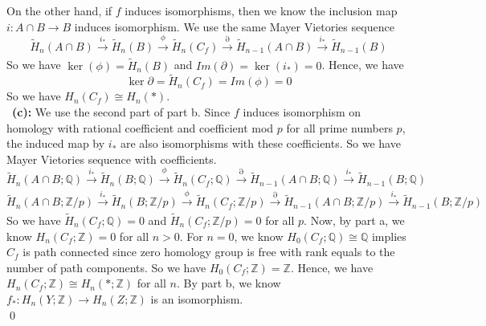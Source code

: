 \documentclass[12pt]{amsart}
\newcommand{\Q}{\mathbb{Q}}
\newcommand{\Z}{\mathbb{Z}}
\begin{document}
On the other hand, if $f$ induces isomorphisms, then we know the inclusion map $i:A\cap B\to B$ induces isomorphism. We use the same Mayer Vietories sequence 
\[\tilde{H}_n(A\cap B)\xrightarrow[]{i_\ast} \tilde{H}_n(B)\xrightarrow[]{\phi} \tilde{H}_n(C_f)\xrightarrow[]{\partial} \tilde{H}_{n-1}(A\cap B)\xrightarrow[]{i_\ast} \tilde{H}_{n-1}(B)\]
So we have $\ker(\phi)=\tilde{H}_n(B)$ and $Im(\partial)=\ker(i_\ast)=0$. Hence, we have 
\[\ker\partial=\tilde{H}_n(C_f)=Im(\phi)=0\]
So we have $H_n(C_f)\cong H_n(\ast)$.\\\
\textbf{(c):} We use the second part of part b. Since $f$ induces isomorphism on homology with rational coefficient and coefficient mod $p$ for all prime numbers $p$, the induced map by $i_\ast$ are also isomorphisms with these coefficients. So we have Mayer Vietories sequence with coefficients.
\[\tilde{H}_n(A\cap B;\Q)\xrightarrow[]{i_\ast} \tilde{H}_n(B;\Q)\xrightarrow[]{\phi} \tilde{H}_n(C_f;\Q)\xrightarrow[]{\partial} \tilde{H}_{n-1}(A\cap B;\Q)\xrightarrow[]{i_\ast} \tilde{H}_{n-1}(B;\Q)\]
\[\tilde{H}_n(A\cap B;\Z/p)\xrightarrow[]{i_\ast} \tilde{H}_n(B;\Z/p)\xrightarrow[]{\phi} \tilde{H}_n(C_f;\Z/p)\xrightarrow[]{\partial} \tilde{H}_{n-1}(A\cap B;\Z/p)\xrightarrow[]{i_\ast} \tilde{H}_{n-1}(B;\Z/p)\]
So we have $\tilde{H}_n(C_f;\Q)=0$ and $\tilde{H}_n(C_f;\Z/p)=0$ for all $p$. Now, by part a, we know $H_n(C_f;\Z)=0$ for all $n>0$. For $n=0$, we know $H_0(C_f;\Q)\cong \Q$ implies $C_f$ is path connected since zero homology group is free with rank equals to the number of path components. So we have $H_0(C_f;\Z)=\Z$. Hence, we have $H_n(C_f;\Z)\cong H_n(\ast;\Z)$ for all $n$. By part b, we know $f_\ast:H_n(Y;\Z)\to H_n(Z;\Z)$ is an isomorphism.
\\\qed\\
\end{document}

